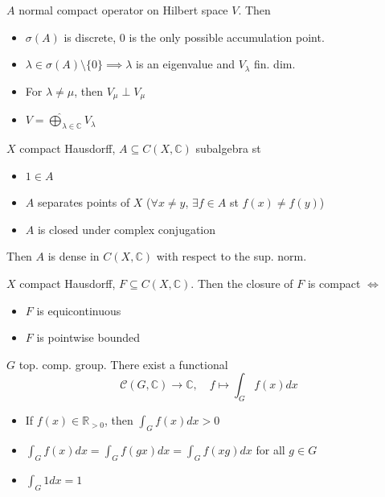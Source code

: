 \begin{theorem} $A$  normal compact operator on Hilbert space $V$. Then
\begin{itemize}[topsep=-6pt, itemsep=0pt]
    \item $\sigma (A)$ is discrete, $0$ is the only possible accumulation point.
    \item $ \lambda \in \sigma (A) \setminus \{0\} \implies \lambda$ is an eigenvalue and $V_{\lambda }$ fin. dim.
    \item For $\lambda \neq \mu$, then $V_{\mu} \perp V_\mu$ 
    \item $V = \hat{\bigoplus}_{\lambda \in \mathbb{C}} V_\lambda$ 
\end{itemize}
\end{theorem}

\begin{theorem} $X$ compact Hausdorff, $A \subseteq C(X, \mathbb{C})$ subalgebra st
\begin{itemize}[topsep=-6pt, itemsep=0pt]
    \item $1 \in A$ 
    \item $A$ separates points of $X$ ($\forall x \neq y$, $\exists f \in A$ st $f(x) \neq f(y)$)
    \item $A$ is closed under complex conjugation
\end{itemize}
Then $A$ is dense in $C(X, \mathbb{C})$ with respect to the sup. norm.
\end{theorem}

\begin{theorem} $X$ compact Hausdorff, $F \subseteq C(X, \mathbb{C})$. Then the closure of $F$ is compact $ \iff $ 
\begin{itemize}[topsep=-6pt, itemsep=0pt]
    \item $F$ is equicontinuous
    \item $F$ is pointwise bounded
\end{itemize}
\end{theorem}

\begin{theorem} $G$ top. comp. group. There exist a functional
\[
\mathcal{C} (G, \mathbb{C}) \to \mathbb{C}, \quad f \mapsto \int_G f(x) dx
\]
\begin{itemize}[topsep=-6pt, itemsep=0pt]
    \item If $f(x) \in \mathbb{R}_{>0}$, then $\int_G f(x) dx > 0$
    \item $\int _Gf(x) dx = \int _Gf(gx) dx = \int _Gf(xg) dx$ for all $g \in G$
    \item $\int _G 1 dx = 1$
\end{itemize}
\end{theorem}

